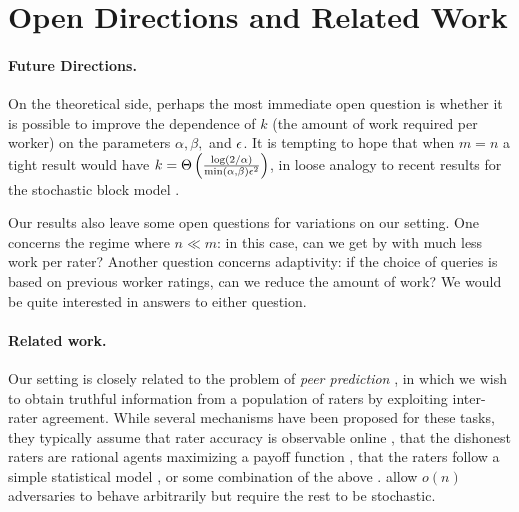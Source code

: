 \section{Open Directions and Related Work}
\label{sec:discussion}
\iffalse
\todo{fill in with lower bounds and conjectures that explain what 
``best possible'' result would look like, and how adversarial and 
stochastic settings compare}\fi

\paragraph{Future Directions.}
On the theoretical side, perhaps the most immediate open question is whether it is 
possible to improve the dependence of $k$ (the amount of work required per worker) 
on the parameters $\alpha, \beta,$ and $\epsilon$.  It is tempting to hope that 
when $m = n$ a tight result would have 
$k = \Theta\left( \frac{\log(2/\alpha)}{\min (\alpha,\beta)\epsilon^2} \right)$, in loose analogy
to recent results for the stochastic block model .

Our results also leave some open questions for variations on our setting. 
One concerns the regime where $n \ll m$: in this case, can we get by 
with much less work per rater?
Another question concerns adaptivity: if the choice of queries is based 
on previous worker ratings, can we reduce the amount of work?
We would be quite interested in answers to either question.


\paragraph{Related work.}
Our setting is closely related to the problem of \emph{peer prediction} 
, in which we wish to obtain truthful information 
from a population of raters by exploiting inter-rater agreement. 
While several mechanisms have been proposed for these tasks, 
they typically assume that rater accuracy is observable online
, that the dishonest raters are 
rational agents maximizing a payoff function , that the raters follow a simple 
statistical model , or some combination of the above . 
 allow $o(n)$ adversaries 
to behave arbitrarily but require the rest to be stochastic.

